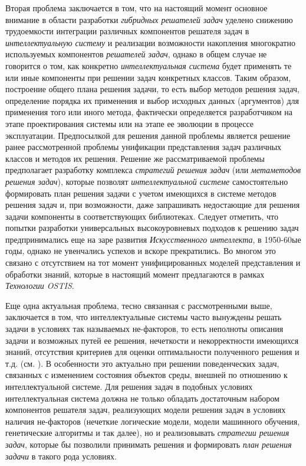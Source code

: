 Вторая проблема заключается в том, что на настоящий момент основное внимание в области разработки \textit{гибридных решателей задач} уделено снижению трудоемкости интеграции различных компонентов решателя задач в \textit{интеллектуальную систему} и реализации возможности накопления многократно используемых компонентов \textit{решателей задач}, однако в общем случае не говорится о том, как конкретно \textit{интеллектуальная система} будет применять те или иные компоненты при решении задач конкретных классов. Таким образом, построение общего плана решения задачи, то есть выбор методов решения задач, определение порядка их применения и выбор исходных данных (аргументов) для применения того или иного метода, фактически определяется разработчиком на этапе проектирования системы или на этапе ее эволюции в процессе эксплуатации. Предпосылкой для решения данной проблемы является решение ранее рассмотренной проблемы унификации представления задач различных классов и методов их решения. Решение же рассматриваемой проблемы предполагает разработку комплекса \textit{стратегий решения задач} (или \textit{метаметодов решения задач}), которые позволят \textit{интеллектуальной системе} самостоятельно формировать план решения задачи с учетом имеющихся в системе методов решения задач и, при возможности, даже запрашивать недостающие для решения задачи компоненты в соответствующих библиотеках. Следует отметить, что попытки разработки универсальных высокоуровневых подходов к решению задач предпринимались еще на заре развития \textit{Искусственного интеллекта}, в 1950-60ые годы, однако не увенчались успехов и вскоре прекратились. Во многом это связано с отсутствием на тот момент унифицированных моделей представления и обработки знаний, которые в настоящий момент предлагаются в рамках \textit{Технологии OSTIS}. 

Еще одна актуальная проблема, тесно связанная с рассмотренными выше, заключается в том, что интеллектуальные системы часто вынуждены решать задачи в условиях так называемых не-факторов, то есть неполноты описания задачи и возможных путей ее решения, нечеткости и некорректности имеющихся знаний, отсутствия критериев для оценки оптимальности полученного решения и т.д. (см. ). В особенности это актуально при решении поведенческих задач, связанных с изменением состояния объектов среды, внешней по отношению к интеллектуальной системе. Для решения задач в подобных условиях интеллектуальная система должна не только обладать достаточным набором компонентов решателя задач, реализующих модели решения задач в условиях наличия не-факторов (нечеткие логические модели, модели машинного обучения, генетические алгоритмы и так далее), но и реализовывать \textit{стратегии решения задач}, которые бы позволили принимать решения и формировать \textit{план решения задачи} в такого рода условиях.

